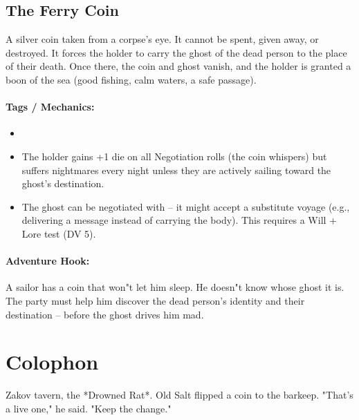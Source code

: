 \subsection*{The Ferry Coin}

A silver coin taken from a corpse's eye. It cannot be spent, given away, or destroyed. It forces the holder to carry the ghost of the dead person to the place of their death. Once there, the coin and ghost vanish, and the holder is granted a boon of the sea (good fishing, calm waters, a safe passage).

\paragraph{Tags / Mechanics:}
\begin{itemize}
\item [CURSE] [SACRIFICE]
\item The holder gains +1 die on all Negotiation rolls (the coin whispers) but suffers nightmares every night unless they are actively sailing toward the ghost's destination.
\item The ghost can be negotiated with -- it might accept a substitute voyage (e.g., delivering a message instead of carrying the body). This requires a Will + Lore test (DV 5).
\end{itemize}

\paragraph{Adventure Hook:}
A sailor has a coin that won"t let him sleep. He doesn"t know whose ghost it is. The party must help him discover the dead person's identity and their destination -- before the ghost drives him mad.

\section*{Colophon}
Zakov tavern, the *Drowned Rat*. Old Salt flipped a coin to the barkeep. "That's a live one," he said. "Keep the change."

